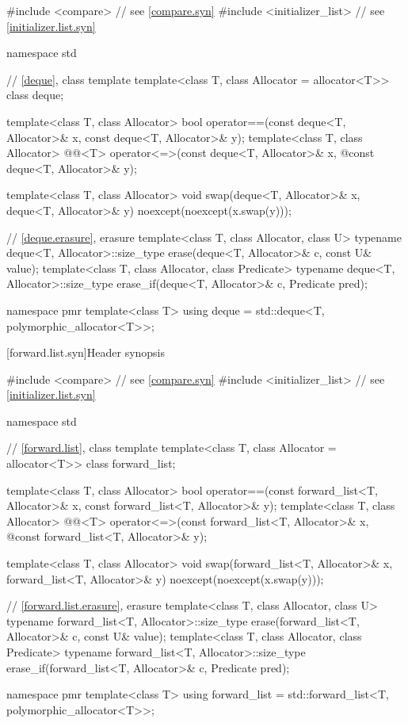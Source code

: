%
\begin{codeblock}
#include <compare>              // see \ref{compare.syn}
#include <initializer_list>     // see \ref{initializer.list.syn}

namespace std {
  // \ref{deque}, class template 
  template<class T, class Allocator = allocator<T>> class deque;

  template<class T, class Allocator>
    bool operator==(const deque<T, Allocator>& x, const deque<T, Allocator>& y);
  template<class T, class Allocator>
    @@<T> operator<=>(const deque<T, Allocator>& x,
    @\itcorr@                                      const deque<T, Allocator>& y);

  template<class T, class Allocator>
    void swap(deque<T, Allocator>& x, deque<T, Allocator>& y)
      noexcept(noexcept(x.swap(y)));

  // \ref{deque.erasure}, erasure
  template<class T, class Allocator, class U>
    typename deque<T, Allocator>::size_type
      erase(deque<T, Allocator>& c, const U& value);
  template<class T, class Allocator, class Predicate>
    typename deque<T, Allocator>::size_type
      erase_if(deque<T, Allocator>& c, Predicate pred);

  namespace pmr {
    template<class T>
      using deque = std::deque<T, polymorphic_allocator<T>>;
  }
}
\end{codeblock}

[forward.list.syn]{Header  synopsis}

%
\begin{codeblock}
#include <compare>              // see \ref{compare.syn}
#include <initializer_list>     // see \ref{initializer.list.syn}

namespace std {
  // \ref{forward.list}, class template 
  template<class T, class Allocator = allocator<T>> class forward_list;

  template<class T, class Allocator>
    bool operator==(const forward_list<T, Allocator>& x, const forward_list<T, Allocator>& y);
  template<class T, class Allocator>
    @@<T> operator<=>(const forward_list<T, Allocator>& x,
    @\itcorr@                                      const forward_list<T, Allocator>& y);

  template<class T, class Allocator>
    void swap(forward_list<T, Allocator>& x, forward_list<T, Allocator>& y)
      noexcept(noexcept(x.swap(y)));

  // \ref{forward.list.erasure}, erasure
  template<class T, class Allocator, class U>
    typename forward_list<T, Allocator>::size_type
      erase(forward_list<T, Allocator>& c, const U& value);
  template<class T, class Allocator, class Predicate>
    typename forward_list<T, Allocator>::size_type
      erase_if(forward_list<T, Allocator>& c, Predicate pred);

  namespace pmr {
    template<class T>
      using forward_list = std::forward_list<T, polymorphic_allocator<T>>;
  }
}
\end{codeblock}

